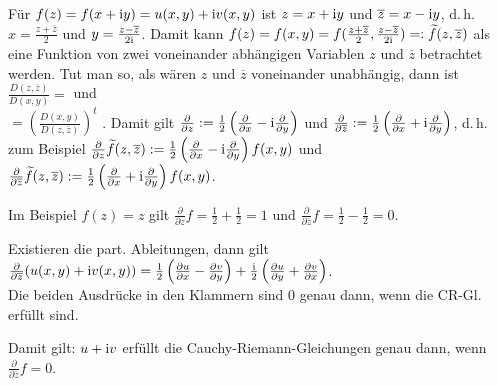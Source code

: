 Für $f(z) = f(x + \mathrm{i} y) = u(x, y) + \mathrm{i} v(x, y)$ ist
$z = x + \mathrm{i} y$ und $\overline{z} = x - \mathrm{i} y$, d.\,h.\\
$x = \frac{z + \overline{z}}{2}$ und $y = \frac{z - \overline{z}}{2 \mathrm{i}}$.
Damit kann $f(z) = f(x, y) =
f(\frac{z + \overline{z}}{2}, \frac{z - \overline{z}}{2 \mathrm{i}}) =:
\widetilde{f}(z, \overline{z})$ als eine Funktion von zwei voneinander
abhängigen Variablen $z$ und $\overline{z}$ betrachtet werden.
Tut man so, als wären $z$ und $\overline{z}$ voneinander unabhängig, dann ist
$\frac{D(z, \overline{z})}{D(x, y)} =$
 und\\
 $=
\left(\frac{D(x, y)}{D(z, \overline{z})}\right)^t$
.
Damit gilt $\frac{\partial}{\partial z} :=
\frac{1}{2} \left(\frac{\partial}{\partial x} -
\mathrm{i} \frac{\partial}{\partial y}\right)$ und
$\frac{\partial}{\partial \overline{z}} :=
\frac{1}{2} \left(\frac{\partial}{\partial x} +
\mathrm{i} \frac{\partial}{\partial y}\right)$, d.\,h. zum Beispiel
$\frac{\partial}{\partial z} \widetilde{f}(z, \overline{z}) :=
\frac{1}{2} \left(\frac{\partial}{\partial x} -
\mathrm{i} \frac{\partial}{\partial y}\right) f(x, y)$ und
$\frac{\partial}{\partial \overline{z}} \widetilde{f}(z, \overline{z}) :=
\frac{1}{2} \left(\frac{\partial}{\partial x} +
\mathrm{i} \frac{\partial}{\partial y}\right) f(x, y)$.

Im Beispiel $f(z) = z$ gilt
$\frac{\partial}{\partial z} f = \frac{1}{2} + \frac{1}{2} = 1$ und
$\frac{\partial}{\partial \overline{z}} f = \frac{1}{2} - \frac{1}{2} = 0$.

Existieren die part. Ableitungen, dann gilt
$\frac{\partial}{\partial \overline{z}} (u(x, y) + \mathrm{i} v(x, y)) =
\frac{1}{2} \left(\frac{\partial u}{\partial x} -
\frac{\partial v}{\partial y}\right) +
\frac{\mathrm{i}}{2} \left(\frac{\partial u}{\partial y} +
\frac{\partial v}{\partial x}\right)$.\\
Die beiden Ausdrücke in den Klammern sind $0$ genau dann, wenn
die CR-Gl. erfüllt sind.

Damit gilt:
$u + \mathrm{i} v$ erfüllt die Cauchy-Riemann-Gleichungen genau dann, wenn
$\frac{\partial}{\partial \overline{z}} f = 0$.

